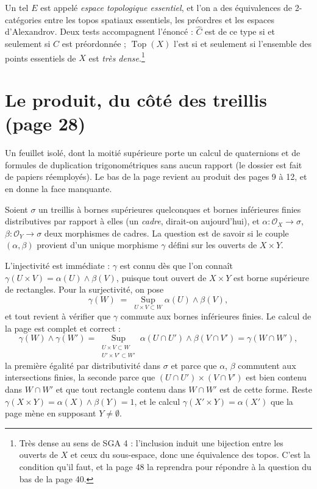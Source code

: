 \documentclass[11pt,a4paper]{article}
\begin{document}
Un tel $E$ est appelé \emph{espace topologique essentiel}, et l'on a des
équivalences de 2-catégories entre les topos spatiaux essentiels, les
préordres et les espaces d'Alexandrov. Deux tests accompagnent l'énoncé :
$\widehat{C}$ est de ce type si et seulement si $C$ est préordonnée ;
$\operatorname{Top}(X)$ l'est si et seulement si l'ensemble des points
essentiels de $X$ est \emph{très dense}.\footnote{Très dense au sens de
SGA 4 : l'inclusion induit une bijection entre les ouverts de $X$ et ceux du
sous-espace, donc une équivalence des topos. C'est la condition
qu'il faut, et la page 48 la reprendra pour répondre à la
question du bas de la page 40.}

\section*{Le produit, du côté des treillis (page 28)}

Un feuillet isolé, dont la moitié supérieure porte un calcul de quaternions et
de formules de duplication trigonométriques sans aucun rapport (le dossier est
fait de papiers réemployés). Le bas de la page revient au produit des pages 9 à
12, et en donne la face manquante.

Soient $\sigma$ un treillis à bornes supérieures quelconques et bornes
inférieures finies distributives par rapport à elles (un \emph{cadre}, dirait-on
aujourd'hui), et $\alpha : \mathcal{O}_{X} \to \sigma$,
$\beta : \mathcal{O}_{Y} \to \sigma$ deux morphismes de cadres. La question est
de savoir si le couple $(\alpha,\beta)$ provient d'un unique morphisme
$\gamma$ défini sur les ouverts de $X \times Y$.

L'injectivité est immédiate : $\gamma$ est connu dès que l'on connaît
$\gamma(U \times V) = \alpha(U) \wedge \beta(V)$, puisque tout ouvert de
$X \times Y$ est borne supérieure de rectangles. Pour la surjectivité, on pose
\[
\gamma(W) \;=\; \operatorname*{Sup}_{U \times V \subset W}
\alpha(U) \wedge \beta(V),
\]
et tout revient à vérifier que $\gamma$ commute aux bornes inférieures
finies. Le calcul de la page est complet et correct :
\[
\gamma(W) \wedge \gamma(W')
= \operatorname*{Sup}_{\substack{U \times V \subset W \\ U' \times V' \subset W'}}
\alpha(U \cap U') \wedge \beta(V \cap V')
= \gamma(W \cap W'),
\]
la première égalité par distributivité dans $\sigma$ et parce que $\alpha$,
$\beta$ commutent aux intersections finies, la seconde parce que
$(U \cap U') \times (V \cap V')$ est bien contenu dans $W \cap W'$ et que tout
rectangle contenu dans $W \cap W'$ est de cette forme. Reste
$\gamma(X \times Y) = \alpha(X) \wedge \beta(Y) = 1$, et le calcul
$\gamma(X' \times Y) = \alpha(X')$ que la page mène en supposant
$Y \neq \emptyset$.
\end{document}
